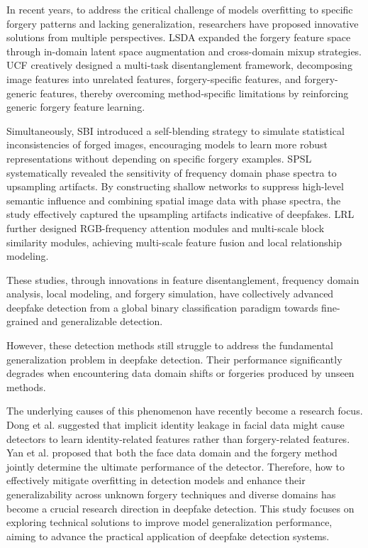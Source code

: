 \documentclass[final,5p,times]{elsarticle}
\begin{document}
In recent years, to address the critical challenge of models overfitting to specific forgery patterns and lacking generalization, researchers have proposed innovative solutions from multiple perspectives. LSDA \cite{26} expanded the forgery feature space through in-domain latent space augmentation and cross-domain mixup strategies. UCF \cite{10} creatively designed a multi-task disentanglement framework, decomposing image features into unrelated features, forgery-specific features, and forgery-generic features, thereby overcoming method-specific limitations by reinforcing generic forgery feature learning.

Simultaneously, SBI \cite{18} introduced a self-blending strategy to simulate statistical inconsistencies of forged images, encouraging models to learn more robust representations without depending on specific forgery examples. SPSL \cite{27} systematically revealed the sensitivity of frequency domain phase spectra to upsampling artifacts. By constructing shallow networks to suppress high-level semantic influence and combining spatial image data with phase spectra, the study effectively captured the upsampling artifacts indicative of deepfakes. LRL \cite{28} further designed RGB-frequency attention modules and multi-scale block similarity modules, achieving multi-scale feature fusion and local relationship modeling.

These studies, through innovations in feature disentanglement, frequency domain analysis, local modeling, and forgery simulation, have collectively advanced deepfake detection from a global binary classification paradigm towards fine-grained and generalizable detection.

However, these detection methods still struggle to address the fundamental generalization problem in deepfake detection. Their performance significantly degrades when encountering data domain shifts or forgeries produced by unseen methods.

The underlying causes of this phenomenon have recently become a research focus. Dong et al. \cite{29} suggested that implicit identity leakage in facial data might cause detectors to learn identity-related features rather than forgery-related features. Yan et al. \cite{1} proposed that both the face data domain and the forgery method jointly determine the ultimate performance of the detector. Therefore, how to effectively mitigate overfitting in detection models and enhance their generalizability across unknown forgery techniques and diverse domains has become a crucial research direction in deepfake detection.
This study focuses on exploring technical solutions to improve model generalization performance, aiming to advance the practical application of deepfake detection systems.
\end{document}
